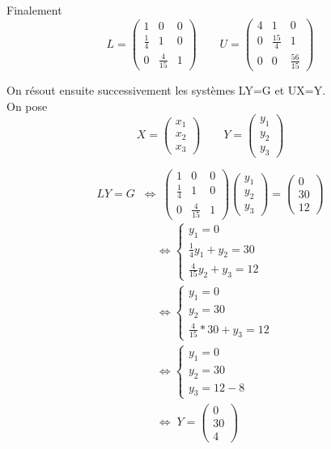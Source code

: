 \documentclass{article}
\begin{document}
Finalement
\[L=\begin{pmatrix}
   1 & 0 & 0 \\
   \frac{1}{4} & 1 & 0 \\
   0 & \frac{4}{15} & 1  
\end{pmatrix}
\qquad
U=\begin{pmatrix}
   4 & 1 & 0 \\
   0 & \frac{15}{4} & 1 \\
   0 & 0 & \frac{56}{15}  
\end{pmatrix}\]

\newpage
\begingroup\raggedleft
On r\'{e}sout ensuite successivement les syst\`{e}mes LY=G et UX=Y.
\endgroup
\\
On pose
\[X=\begin{pmatrix}
   x_1 \\
   x_2 \\
   x_3  
\end{pmatrix}
\qquad Y=\begin{pmatrix}
   y_1 \\
   y_2 \\
   y_3  
\end{pmatrix}\]


\[LY=G \;\; \Leftrightarrow \; \begin{pmatrix}
   1 & 0 & 0 \\
  \frac{1}{4} & 1 & 0 \\
   0 & \frac{4}{15} & 1
\end{pmatrix}
\begin{pmatrix}
   y_1 \\
   y_2 \\
   y_3  
\end{pmatrix} = \begin{pmatrix}
   0 \\
   30 \\
   12  
\end{pmatrix}\]
\begin{align*}
&\Leftrightarrow \left\{\begin{array}{ll}
y_1=0\\[5pt] 
\frac{1}{4}y_1+y_2=30 \\[5pt] 
\frac{4}{15}y_2 +y_3=12
 \end{array}\right.
\\[5pt]  
& \Leftrightarrow \left\{\begin{array}{ll}
y_1=0\\[5pt] 
y_2=30 \\[5pt] 
\frac{4}{15} * 30 +y_3=12
\end{array}\right.
\\[5pt] 
&\Leftrightarrow \left\{\begin{array}{ll}
y_1 = 0\\[5pt] 
y_2 = 30 \\[5pt] 
y_3 = 12 - 8
\end{array}\right.
\\[5pt]  
&\Leftrightarrow \;  Y= \begin{pmatrix}
0 \\
30 \\
4  
\end{pmatrix}
\end{align*}
\end{document}
